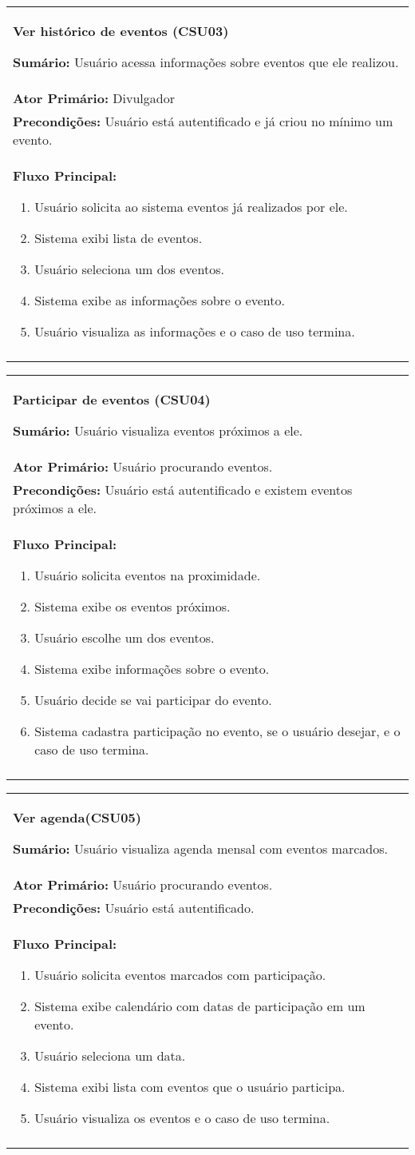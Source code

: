\documentclass{article}
\newcommand{\sumario}[1] {\textbf{Sumário:} #1\\ }
\newcommand{\ator}[1] {\textbf{Ator Primário:} #1\\}
\newcommand{\precond}[1] {\textbf{Precondições:} #1\\}
\newcommand{\fluxo}{\textbf{Fluxo Principal:}}
\newenvironment{boxed}[1]
			    {
			\begin{center}
			    \begin{tabular}{|p{\textwidth}|}
			    \hline
			\begin{center}
				{\large \textbf{#1}}
			\end{center}
			    }
			    { 
			    \\\\\hline
			    \end{tabular} 
			    \end{center}
			    }
\begin{document}
			\begin{boxed}{Ver histórico de eventos (CSU03)}
			\sumario{Usuário acessa informações sobre eventos que ele realizou.}
			\ator{Divulgador}
			\precond{Usuário está autentificado e já criou no mínimo um evento.}
			\fluxo
			\begin{enumerate}[itemsep=0mm]
			\item Usuário solicita ao sistema eventos já realizados por ele.
			\item Sistema exibi lista de eventos.
			\item Usuário seleciona um dos eventos.
			\item Sistema exibe as informações sobre o evento.
			\item Usuário visualiza as informações e o caso de uso termina.
			\end{enumerate}
			\end{boxed}
			
			\begin{boxed}{Participar de  eventos (CSU04)}
			\sumario{Usuário visualiza eventos próximos a ele.}
			\ator{Usuário procurando eventos.}
			\precond{Usuário está autentificado e existem eventos próximos a ele.}
			\fluxo
			\begin{enumerate}[itemsep=0mm]
			\item Usuário solicita eventos na proximidade.
			\item Sistema exibe os eventos próximos.
			\item Usuário escolhe um dos eventos.
			\item Sistema exibe informações sobre o evento.
			\item Usuário decide se vai participar do evento.
			\item Sistema cadastra participação no evento, se o usuário desejar, e o caso de uso termina.\bigskip
			\end{enumerate}
			\end{boxed}
			
			\begin{boxed}{Ver agenda(CSU05)}
			\sumario{Usuário visualiza agenda mensal com eventos marcados.}
			\ator{Usuário procurando eventos.}
			\precond{Usuário está autentificado.}
			\fluxo
			\begin{enumerate}[itemsep=0mm]
			\item Usuário solicita eventos marcados com participação.
			\item Sistema exibe calendário com datas de participação em um evento.
			\item Usuário seleciona um data.
			\item Sistema exibi lista com eventos que o usuário participa.
			\item Usuário visualiza os eventos e o caso de uso termina.
			\end{enumerate}
			\end{boxed}
			
\end{document}
